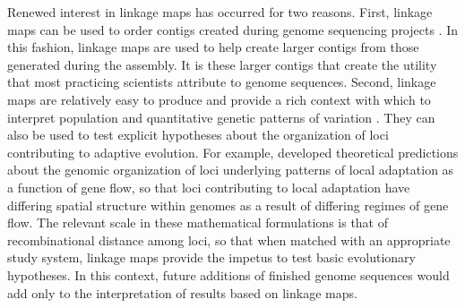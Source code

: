 \documentclass[11pt]{article}
\begin{document}
Renewed interest in linkage maps has occurred for two reasons. First, linkage maps can be used to order contigs 
created during genome sequencing projects \citep{Mackay:2012, Martinez-Garcia:2013}. In this fashion, linkage 
maps are used to help create larger contigs from those generated during the assembly. It is these larger contigs that 
create the utility that most practicing scientists attribute to genome sequences. Second, linkage maps are relatively 
easy to produce and provide a rich context with which to interpret population and quantitative genetic patterns of variation 
\citep[e.g.][]{Eckert:2010a, Eckert:2010b, Eckert:2013a, Yeaman:2013}. They can also be used to test explicit hypotheses about 
the organization of loci contributing to adaptive evolution. For example, \citet{Yeaman:2011} developed theoretical 
predictions about the genomic organization of loci underlying patterns of local adaptation as a function of gene flow, 
so that loci contributing to local adaptation have differing spatial structure within genomes as a result of differing 
regimes of gene flow. The relevant scale \citep[\textit{sensu}][]{Houle:2011} in these mathematical formulations is that 
of recombinational distance among loci, so that when matched with an appropriate study system, 
linkage maps provide the impetus to test basic evolutionary hypotheses. In this context, future additions of finished 
genome sequences would add only to the interpretation of results based on linkage maps.
\end{document}
